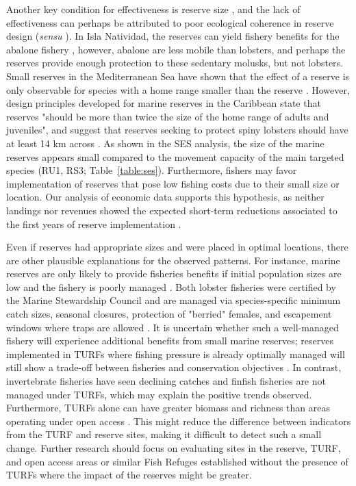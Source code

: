 \documentclass[10pt,letterpaper]{article}
\begin{document}
Another key condition for effectiveness is reserve size \cite{edgar_2014-UO}, and the lack of effectiveness can perhaps be attributed to poor ecological coherence in reserve design (\emph{sensu} \cite{rees_2018}). In Isla Natividad, the reserves can yield fishery benefits for the abalone fishery \cite{rossetto_2015-V0}, however, abalone are less mobile than lobsters, and perhaps the reserves provide enough protection to these sedentary molusks, but not lobsters. Small reserves in the Mediterranean Sea have shown that the effect of a reserve is only observable for species with a home range smaller than the reserve \cite{difranco_2018}. However, design principles developed for marine reserves in the Caribbean state that reserves "should be more than twice the size of the home range of adults and juveniles", and suggest that reserves seeking to protect spiny lobsters should have at least 14 km across \cite{green_2017}. As shown in the SES analysis, the size of the marine reserves appears small compared to the movement capacity of the main targeted species (RU1, RS3; Table~\ref{table:ses}). Furthermore, fishers may favor implementation of reserves that pose low fishing costs due to their small size or location. Our analysis of economic data supports this hypothesis, as neither landings nor revenues showed the expected short-term reductions associated to the first years of reserve implementation \cite{ovando_2016-Wg}.

Even if reserves had appropriate sizes and were placed in optimal locations, there are other plausible explanations for the observed patterns. For instance, marine reserves are only likely to provide fisheries benefits if initial population sizes are low and the fishery is poorly managed \cite{hilborn_2004,hilborn_2006}. Both lobster fisheries were certified by the Marine Stewardship Council and are managed via species-specific minimum catch sizes, seasonal closures, protection of "berried" females, and escapement windows where traps are allowed \cite{dof_website_1993}. It is uncertain whether such a well-managed fishery will experience additional benefits from small marine reserves; reserves implemented in TURFs where fishing pressure is already optimally managed will still show a trade-off between fisheries and conservation objectives \cite{lester_2017}. In contrast, invertebrate fisheries have seen declining catches and finfish fisheries are not managed under TURFs, which may explain the positive trends observed. Furthermore, TURFs alone can have greater biomass and richness than areas operating under open access \cite{gelcich_2008}. This might reduce the difference between indicators from the TURF and reserve sites, making it difficult to detect such a small change. Further research should focus on evaluating sites in the reserve, TURF, and open access areas or similar Fish Refuges established without the presence of TURFs where the impact of the reserves might be greater.
\end{document}
